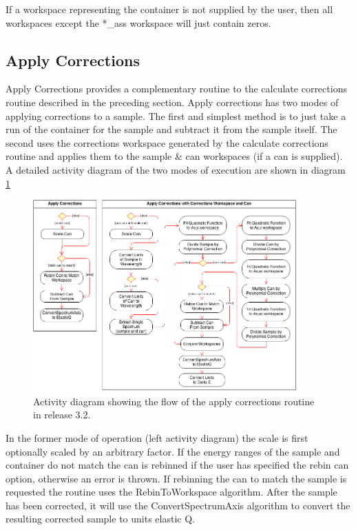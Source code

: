\documentclass[paper=a4, fontsize=11pt]{scrartcl}	%
\numberwithin{equation}{section}															%
\numberwithin{figure}{section}																%
\numberwithin{table}{section}																%
\begin{document}
If a workspace representing the container is not supplied by the user, then all workspaces except the \**\_ass workspace will just contain zeros.

\subsection{Apply Corrections}
\label{subsubsec:apply-corrections}

Apply Corrections provides a complementary routine to the calculate corrections routine described in the preceding section. Apply corrections has two modes of applying corrections to a sample. The first and simplest method is to just take a run of the container for the sample and subtract it from the sample itself. The second uses the corrections workspace generated by the calculate corrections routine and applies them to the sample \& can workspaces (if a can is supplied). A detailed activity diagram of the two modes of execution are shown in diagram \ref{fig:applycorr-activity-diagram}

\begin{figure}[H]
\centering
\includegraphics[width=0.9\textwidth]{img/uml/activity_diagrams/ApplyCorr_activity.png}
\caption{Activity diagram showing the flow of the apply corrections routine in release 3.2.}
\label{fig:applycorr-activity-diagram}
\end{figure}

In the former mode of operation (left activity diagram) the scale is first optionally scaled by an arbitrary factor. If the energy ranges of the sample and container do not match the can is rebinned if the user has specified the rebin can option, otherwise an error is thrown. If rebinning the can to match the sample is requested the routine uses the RebinToWorkspace algorithm. After the sample has been corrected, it will use the ConvertSpectrumAxis algorithm to convert the resulting corrected sample to units elastic Q.
\end{document}
